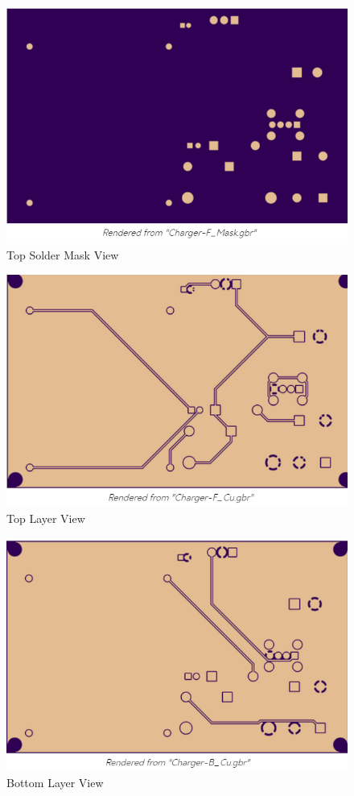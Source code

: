 \documentclass{article}
\begin{document}
\begin{figure}[h!]
\centerline{\includegraphics[scale=.8]{Images/u1.png}}
\caption{Top Solder Mask View}
\label{figb}
\end{figure}


\begin{figure}[h!]
\centerline{\includegraphics[scale=.6]{Images/u2.png}}
\caption{Top Layer View}
\label{figb}
\end{figure}

\begin{figure}[h!]
\centerline{\includegraphics[scale=.6]{Images/u3.png}}
\caption{Bottom Layer View}
\label{figb}
\end{figure}
\end{document}
